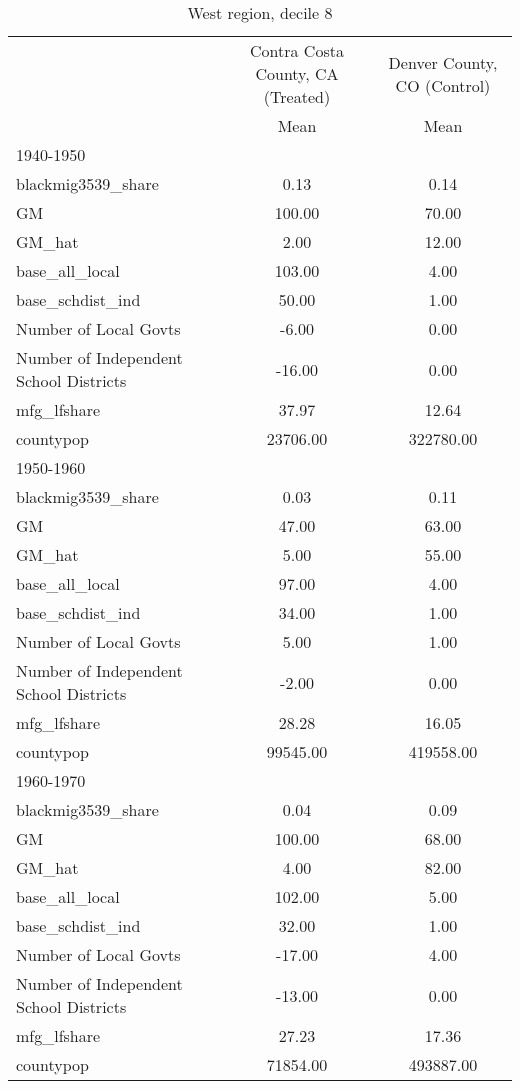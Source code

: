 \begin{table}[htbp]\centering
\def\sym#1{\ifmmode^{#1}\else\(^{#1}\)\fi}
\caption{West region, decile 8 \label{tab1}}
\begin{tabular}{l*{2}{c}}
\toprule
                    &\multicolumn{1}{c}{Contra Costa County, CA (Treated)}&\multicolumn{1}{c}{Denver County, CO (Control)}\\
                    &        Mean&        Mean\\
\midrule
1940-1950           &            &            \\
blackmig3539\_share  &        0.13&        0.14\\
GM                  &      100.00&       70.00\\
GM\_hat              &        2.00&       12.00\\
base\_all\_local      &      103.00&        4.00\\
base\_schdist\_ind    &       50.00&        1.00\\
Number of Local Govts&       -6.00&        0.00\\
Number of Independent School Districts&      -16.00&        0.00\\
mfg\_lfshare         &       37.97&       12.64\\
countypop           &    23706.00&   322780.00\\
\midrule
1950-1960           &            &            \\
blackmig3539\_share  &        0.03&        0.11\\
GM                  &       47.00&       63.00\\
GM\_hat              &        5.00&       55.00\\
base\_all\_local      &       97.00&        4.00\\
base\_schdist\_ind    &       34.00&        1.00\\
Number of Local Govts&        5.00&        1.00\\
Number of Independent School Districts&       -2.00&        0.00\\
mfg\_lfshare         &       28.28&       16.05\\
countypop           &    99545.00&   419558.00\\
\midrule
1960-1970           &            &            \\
blackmig3539\_share  &        0.04&        0.09\\
GM                  &      100.00&       68.00\\
GM\_hat              &        4.00&       82.00\\
base\_all\_local      &      102.00&        5.00\\
base\_schdist\_ind    &       32.00&        1.00\\
Number of Local Govts&      -17.00&        4.00\\
Number of Independent School Districts&      -13.00&        0.00\\
mfg\_lfshare         &       27.23&       17.36\\
countypop           &    71854.00&   493887.00\\
\bottomrule
\end{tabular}
\end{table}
